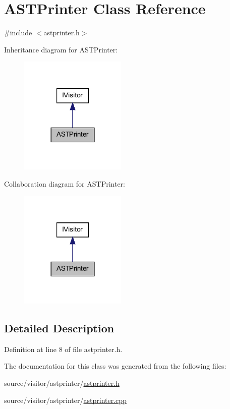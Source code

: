 \hypertarget{class_a_s_t_printer}{
\section{ASTPrinter Class Reference}
\label{class_a_s_t_printer}
}


{\ttfamily \#include $<$astprinter.h$>$}



Inheritance diagram for ASTPrinter:
\nopagebreak
\begin{figure}[H]
\begin{center}
\leavevmode
\includegraphics[width=144pt]{class_a_s_t_printer__inherit__graph}
\end{center}
\end{figure}


Collaboration diagram for ASTPrinter:
\nopagebreak
\begin{figure}[H]
\begin{center}
\leavevmode
\includegraphics[width=144pt]{class_a_s_t_printer__coll__graph}
\end{center}
\end{figure}


\subsection{Detailed Description}


Definition at line 8 of file astprinter.h.



The documentation for this class was generated from the following files:\begin{DoxyCompactItemize}
\item 
source/visitor/astprinter/\hyperlink{astprinter_8h}{astprinter.h}\item 
source/visitor/astprinter/\hyperlink{astprinter_8cpp}{astprinter.cpp}\end{DoxyCompactItemize}
